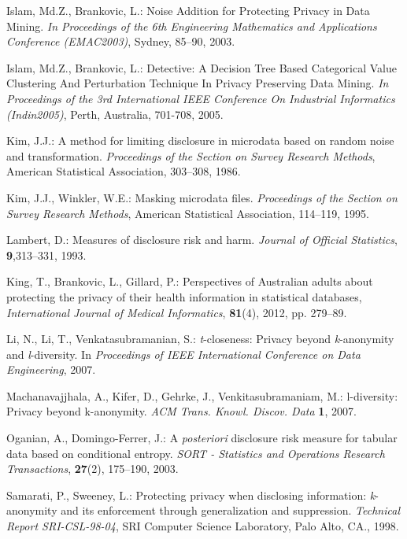 \documentclass{llncs}
\begin{document}
\begin{thebibliography}{10}
Islam, Md.Z., Brankovic, L.:
Noise Addition for Protecting Privacy in Data Mining.
\emph{In Proceedings of the 6th Engineering Mathematics and Applications Conference (EMAC2003)}, Sydney, 85--90, 2003.

Islam, Md.Z., Brankovic, L.:  Detective: A Decision Tree Based Categorical Value Clustering And Perturbation Technique In Privacy Preserving Data Mining.  \emph{In Proceedings of the 3rd International IEEE Conference On Industrial Informatics (Indin2005)}, Perth,  Australia, 701-708,  2005.

Kim, J.J.: {A method for limiting disclosure in microdata based on random
  noise and transformation}. \emph{Proceedings of the Section on Survey Research
  Methods}, American Statistical Association, 303--308, 1986.

Kim, J.J.,  Winkler, W.E.: {Masking microdata files}. \emph{Proceedings
  of the Section on Survey Research Methods}, American Statistical Association,
  114--119, 1995.

Lambert, D.:  {Measures of disclosure risk and harm}. \emph{Journal of Official
  Statistics}, \textbf{9},313--331, 1993.
	
King, T., Brankovic, L., Gillard, P.: {Perspectives of Australian adults about protecting the privacy of their health information in statistical databases},  \emph{International Journal of Medical Informatics}, \textbf{81}(4), 2012, pp. 279--89.

Li, N.,  Li, T.,  Venkatasubramanian, S.:
  {\emph{t}-closeness: Privacy beyond \emph{k}-anonymity and
  \emph{l}-diversity}. In \emph{Proceedings of IEEE International Conference on Data
  Engineering}, 2007.

Machanavajjhala, A.,  Kifer, D.,  Gehrke, J., Venkitasubramaniam, M.: l-diversity: Privacy beyond k-anonymity. \emph{ACM Trans. Knowl. Discov. Data} \textbf{1}, 2007.



Oganian, A.,  Domingo-Ferrer, J.: {A \emph{posteriori} disclosure
  risk measure for tabular data based on conditional entropy}. \emph{SORT -
  Statistics and Operations Research Transactions}, \textbf{27}(2),
  175--190, 2003.

Samarati, P., Sweeney, L.: {Protecting privacy when
  disclosing information: \emph{k}-anonymity and its enforcement through
  generalization and suppression}. \emph{Technical Report SRI-CSL-98-04}, SRI Computer
  Science Laboratory, Palo Alto, CA., 1998.
	

\end{thebibliography}
\end{document}
